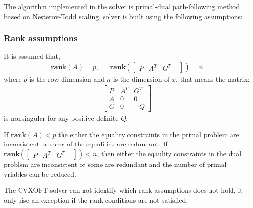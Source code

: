 The algorithm implemented in the  solver is primal-dual path-following method based on Nesterov-Todd scaling.   solver is built using the following assumptions:

\subsubsection*{Rank assumptions}
It is assumed that,
\begin{equation*}
	\begin{aligned}
		\textbf{rank}(A)=p, & & \textbf{rank}(\begin{bmatrix}
			P & A^T & G^T & 
		\end{bmatrix} )=n
	\end{aligned}
\end{equation*}
where $p$ is the row dimension and $n$ is the dimension of $x$. that means the matrix:
\begin{equation*}
	\begin{aligned}
		\begin{bmatrix}
			P & A^T & G^T\\
			A & 0 & 0\\
			G & 0 & -Q
		\end{bmatrix}
	\end{aligned}
\end{equation*} 
is nonsingular for any positive definite $Q$.

If $\textbf{rank}(A)<p$ the  either the equality constraints in the primal problem are inconsistent or some of the equalities are redundant. If $\textbf{rank}(\begin{bmatrix}P & A^T & G^T & \end{bmatrix} )<n$, then either the eqaulity constraints in the dual problem are inconsistent or some are redundant and the number of primal vriables can be reduced.

The CVXOPT solver can not identify which rank assumptions does not hold, it only rise an exception if the rank conditions are not satisfied.

